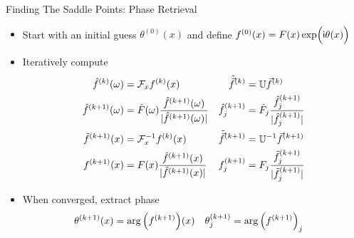 
\begin{frame}{Finding The Saddle Points: Phase Retrieval}
%
\begin{itemize}
\item Start with an initial guess $\theta^{(0)}(x)$ and define $f^{(0)}(x) = F(x) \exp(\Big.\mathsf{i} \theta(x))$
\item Iteratively compute
	\begin{align*}
		\hat{f}^{(k)}(\omega) &= \mathcal{F}_x f^{(k)}(x)
	&
		\hat{\vec{f}}^{(k)} &= \mathbb{U} \vec{f}^{(k)}
\\
		\hat{f}^{(k + 1)}(\omega)
	&=
		\hat{F}(\omega)
		\frac
			{ \hat{f}^{(k + 1)}(\omega) }
			{|\hat{f}^{(k + 1)}(\omega)|}
	&
		\hat{f}^{(k + 1)}_j
	&=
		\hat{F}_j
		\frac
			{ \hat{f}^{(k + 1)}_j }
			{|\hat{f}^{(k + 1)}_j|}
\\
		\tilde{f}^{(k + 1)}(x) &= \mathcal{F}^{-1}_x  f^{(k)}(x)
	&
		\tilde{\vec{f}}^{(k + 1)} &= \mathbb{U}^{-1} \vec{f}^{(k + 1)}
\\
		f^{(k + 1)}(x)
	&=
		F(x)
		\frac
			{ \tilde{f}^{(k + 1)}(x) }
			{|\tilde{f}^{(k + 1)}(x)|}
	&
		f^{(k + 1)}_j
	&=
		F_j
		\frac
			{ \tilde{f}^{(k + 1)}_j }
			{|\tilde{f}^{(k + 1)}_j|}
	\end{align*}
\item When converged, extract phase
	\begin{align*}
		\theta^{(k + 1)}(x) &= \arg\qty(f^{(k + 1)})(x)
	&
		\theta^{(k + 1)}_j &= \arg\qty(f^{(k + 1)})_j
	\end{align*}
\end{itemize}
%
\end{frame}


